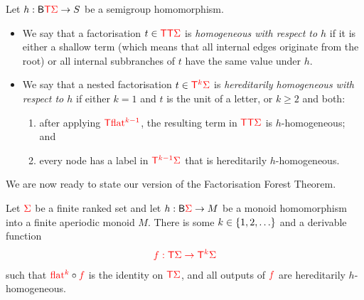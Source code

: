 \begin{definition}\label{def:hom-for}
    Let $h : \mathsf{B} {\color{red}{\mathsf T}} {\color{red}{\Sigma}} \to S$ be a semigroup homomorphism.
    \begin{itemize}
\item     We say that a factorisation $t \in {\color{red}{\mathsf T}} {\color{red}{\mathsf T}} {\color{red}{\Sigma}}$ is \emph{homogeneous with respect to $h$} if it is either a shallow term (which means that all internal edges originate from the root) or all internal subbranches of $t$ have the same value under $h$.
\item We say that a nested factorisation  $t \in {\color{red}{\mathsf T}}^{{\color{red}{k}}}  {\color{red}{\Sigma}}$ is \emph{hereditarily homogeneous with respect to $h$} if either $k=1$ and $t$ is the unit of a letter, or $k \ge 2$ and both:
\begin{enumerate}
    \item  after applying ${\color{red}{\mathsf T}} {\color{red}{\mathrm{flat}}}^{{\color{red}{k-1}}}$,   the resulting term in ${\color{red}{\mathsf T}} {\color{red}{\mathsf T}} {\color{red}{\Sigma}}$ is $h$-homogeneous; and 
    \item every node has a label in ${\color{red}{\mathsf T}}^{{\color{red}{k-1}}} {\color{red}{\Sigma}}$ that is hereditarily $h$-homogeneous. 
\end{enumerate}
    \end{itemize}
\end{definition}

We are now ready to state our version of the Factorisation Forest Theorem. 
\begin{theorem}\label{thm:factfor}
    Let ${\color{red}{\Sigma}}$ be a finite ranked set and let $h : \mathsf{B} {\color{red}{\Sigma}} \to M$ be a monoid homomorphism into a finite aperiodic monoid $M$. There is some $k \in \{1,2,\ldots\}$ and a derivable function
    \begin{align*}
        {\color{red}{f : {\color{red}{\mathsf T}}{\color{red}{\Sigma}}\to {\color{red}{\mathsf T}}^k {\color{red}{\Sigma}}}}  
    \end{align*}
such that ${\color{red}{\mathrm{flat}}}^{{\color{red}{k}}} \circ {\color{red}{f}}$ is the identity on ${\color{red}{\mathsf T}} {\color{red}{\Sigma}}$, and  all outputs of  ${\color{red}{f}}$ are hereditarily $h$-homogeneous.
\end{theorem}



